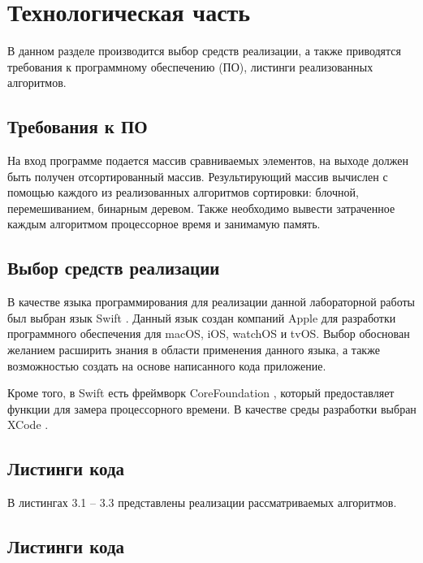 \chapter{Технологическая часть}

В данном разделе производится выбор средств реализации, а также приводятся требования к программному обеспечению (ПО), листинги реализованных алгоритмов.

\section{Требования к ПО}

На вход программе подается массив сравниваемых элементов, на выходе должен быть получен отсортированный массив. Результирующий массив вычислен с помощью каждого из реализованных алгоритмов сортировки: блочной, перемешиванием, бинарным деревом. Также необходимо вывести затраченное каждым алгоритмом процессорное время и занимамую память.

\section{Выбор средств реализации}

В качестве языка программирования для реализации данной лабораторной работы был выбран язык Swift \cite{swift}. Данный язык создан компаний Apple для разработки программного обеспечения для macOS, iOS, watchOS и tvOS. Выбор обоснован желанием расширить знания в области применения данного языка, а также возможностью создать на основе написанного кода приложение.

Кроме того, в Swift есть фреймворк CoreFoundation \cite{core}, который предоставляет функции для замера процессорного времени. В качестве среды разработки выбран XCode \cite{xcode}.

\section{Листинги кода}

В листингах 3.1 -- 3.3 представлены реализации рассматриваемых алгоритмов.

\section{Листинги кода}


